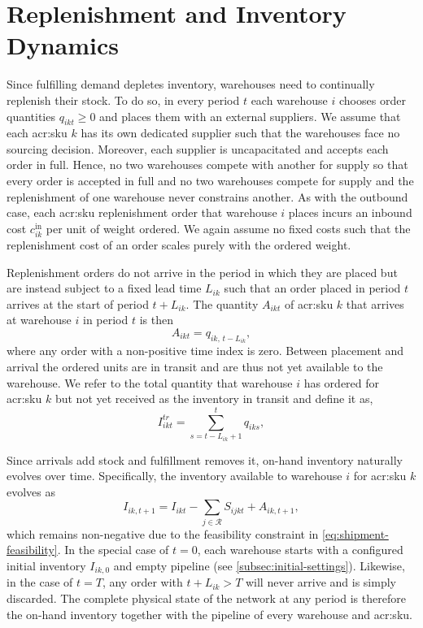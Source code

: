 \section{Replenishment and Inventory Dynamics}
\label{sec:replenishment}
Since fulfilling demand depletes inventory, warehouses need to continually replenish their stock. To do so, in every period $t$ each warehouse $i$ chooses order quantities $q_{ikt} \ge 0$ and places them with an external suppliers. We assume that each \gls{acr:sku} $k$ has its own dedicated supplier such that the warehouses face no sourcing decision. Moreover, each supplier is uncapacitated and accepts each order in full. Hence, no two warehouses compete with another for supply so that every order is accepted in full and no two warehouses compete for supply and the replenishment of one warehouse never constrains another. As with the outbound case, each \gls{acr:sku} replenishment order that warehouse $i$ places incurs an inbound cost $c^{\mathrm{in}}_{ik}$ per unit of weight ordered. We again assume no fixed costs such that the replenishment cost of an order scales purely with the ordered weight.

Replenishment orders do not arrive in the period in which they are placed but are instead subject to a fixed lead time $L_{ik}$ such that an order placed in period $t$ arrives at the start of period $t + L_{ik}$. The quantity $A_{ikt}$ of \gls{acr:sku} $k$ that arrives at warehouse $i$ in period $t$ is then
\begin{equation}
\label{eq:arrivals}
  A_{ikt} = q_{ik,\,t-L_{ik}},
\end{equation}
where any order with a non-positive time index is zero. Between placement and arrival the ordered units are in transit and are thus not yet available to the warehouse. We refer to the total quantity that warehouse $i$ has ordered for \gls{acr:sku} $k$ but not yet received as the inventory in transit and define it as,
\begin{equation}
\label{eq:pipeline}
  I^{tr}_{ikt} = \sum_{s = t - L_{ik} + 1}^{t} q_{iks},
\end{equation}

Since arrivals add stock and fulfillment removes it, on-hand inventory naturally evolves over time. Specifically, the inventory available to warehouse $i$ for \gls{acr:sku} $k$ evolves as
\begin{equation}
\label{eq:inventory-dynamics}
  I_{ik,t+1} = I_{ikt} - \sum_{j \in \mathcal{R}} S_{ijkt} + A_{ik,t+1},
\end{equation}
which remains non-negative due to the feasibility constraint in \autoref{eq:shipment-feasibility}. In the special case of $t=0$, each warehouse starts with a configured initial inventory $I_{ik,0}$ and empty pipeline (see \autoref{subsec:initial-settings}). Likewise, in the case of $t=T$, any order with $t + L_{ik} > T$ will never arrive and is simply discarded. The complete physical state of the network at any period is therefore the on-hand inventory together with the pipeline of every warehouse and \gls{acr:sku}.\\


